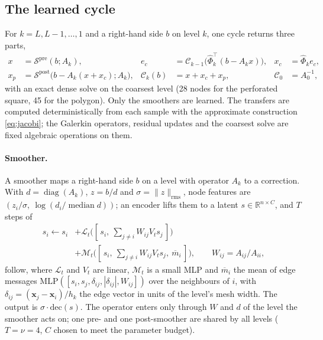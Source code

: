 \subsection{The learned cycle}\label{sec:cycle}
For $k = L, L-1, \dots, 1$ and a right-hand side $b$ on level $k$, one cycle returns three parts,
\begin{equation}\label{eq:cycle}
\begin{aligned}
  x &= \mathcal{S}^{\mathrm{pre}}(b; A_k), &
  e_c &= \mathcal{C}_{k-1}\big(\widehat\Phi_k^{\!\top}(b - A_k x)\big), &
  x_c &= \widehat\Phi_k e_c, \\
  x_p &= \mathcal{S}^{\mathrm{post}}\big(b - A_k(x + x_c); A_k\big), &
  \mathcal{C}_k(b) &= x + x_c + x_p, & \mathcal{C}_0 &= A_0^{-1},
\end{aligned}
\end{equation}
with an exact dense solve on the coarsest level (28 nodes for the perforated square, 45 for the polygon). Only the smoothers are learned. The transfers are computed deterministically from each sample with the approximate
construction \eqref{eq:jacobi}; the Galerkin operators, residual updates and the coarsest solve are fixed algebraic
operations on them.

\paragraph{Smoother.} A smoother maps a right-hand side $b$ on a level with operator $A_k$ to a correction. With
$d = \operatorname{diag}(A_k)$, $z = b/d$ and $\sigma = \|z\|_{\mathrm{rms}}$, node features are
$(z_i/\sigma,\ \log(d_i/\operatorname{median} d))$; an encoder lifts them to a latent $s\in\mathbb{R}^{n\times C}$, and
$T$ steps of
\begin{equation}\label{eq:smoother}
\begin{aligned}
  s_i \leftarrow s_i &+ \mathcal{L}_t\big([\,s_i,\ \textstyle\sum_{j\ne i} W_{ij} V_t s_j\,]\big)\\
       &+ \mathcal{M}_t\big([\,s_i,\ \textstyle\sum_{j\ne i} W_{ij} V_t s_j,\ \overline{m}_i\,]\big),
  \qquad W_{ij} = A_{ij}/A_{ii},
\end{aligned}
\end{equation}
follow, where $\mathcal{L}_t$ and $V_t$ are linear, $\mathcal{M}_t$ is a small MLP and $\overline{m}_i$ the mean of edge
messages $\mathrm{MLP}([s_i,s_j,\delta_{ij},|\delta_{ij}|,W_{ij}])$ over the neighbours of $i$, with
$\delta_{ij} = (\mathbf{x}_j-\mathbf{x}_i)/h_k$ the edge vector in units of the level's mesh width. The output is $\sigma\cdot\mathrm{dec}(s)$. The operator
enters only through $W$ and $d$ of the level the smoother acts on; one pre- and one post-smoother are shared by all
levels ($T = \nu = 4$, $C$ chosen to meet the parameter budget).

